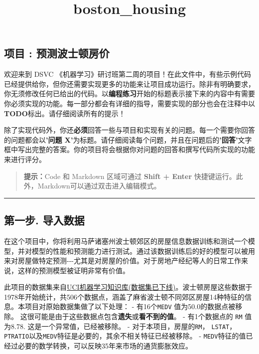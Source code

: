 \documentclass[11pt]{article}
\title{boston\_housing}
\begin{document}
    
    
    \maketitle
    
    

    
    \subsection{项目 :
预测波士顿房价}\label{ux9879ux76ee-ux9884ux6d4bux6ce2ux58ebux987fux623fux4ef7}

欢迎来到 DSVC
《机器学习》研讨班第二周的项目！在此文件中，有些示例代码已经提供给你，但你还需要实现更多的功能来让项目成功运行。除非有明确要求，你无须修改任何已给出的代码。以\textbf{编程练习}开始的标题表示接下来的内容中有需要你必须实现的功能。每一部分都会有详细的指导，需要实现的部分也会在注释中以\textbf{TODO}标出。请仔细阅读所有的提示！

除了实现代码外，你还\textbf{必须}回答一些与项目和实现有关的问题。每一个需要你回答的问题都会以\textbf{'问题
X'}为标题。请仔细阅读每个问题，并且在问题后的\textbf{'回答'}文字框中写出完整的答案。你的项目将会根据你对问题的回答和撰写代码所实现的功能来进行评分。

\begin{quote}
\textbf{提示：}Code 和 Markdown 区域可通过 \textbf{Shift + Enter}
快捷键运行。此外，Markdown可以通过双击进入编辑模式。
\end{quote}

    \begin{center}\rule{0.5\linewidth}{\linethickness}\end{center}

\subsection{第一步.
导入数据}\label{ux7b2cux4e00ux6b65.-ux5bfcux5165ux6570ux636e}

在这个项目中，你将利用马萨诸塞州波士顿郊区的房屋信息数据训练和测试一个模型，并对模型的性能和预测能力进行测试。通过该数据训练后的好的模型可以被用来对房屋做特定预测-\/-\/-尤其是对房屋的价值。对于房地产经纪等人的日常工作来说，这样的预测模型被证明非常有价值。

此项目的数据集来自\href{https://archive.ics.uci.edu/ml/datasets.html}{UCI机器学习知识库(数据集已下线)}。波士顿房屋这些数据于1978年开始统计，共506个数据点，涵盖了麻省波士顿不同郊区房屋14种特征的信息。本项目对原始数据集做了以下处理：
- 有16个\texttt{\textquotesingle{}MEDV\textquotesingle{}}
值为50.0的数据点被移除。
这很可能是由于这些数据点包含\textbf{遗失}或\textbf{看不到的值}。 -
有1个数据点的 \texttt{\textquotesingle{}RM\textquotesingle{}} 值为8.78.
这是一个异常值，已经被移除。 -
对于本项目，房屋的\texttt{\textquotesingle{}RM\textquotesingle{}}，
\texttt{\textquotesingle{}LSTAT\textquotesingle{}}，\texttt{\textquotesingle{}PTRATIO\textquotesingle{}}以及\texttt{\textquotesingle{}MEDV\textquotesingle{}}特征是必要的，其余不相关特征已经被移除。
-
\texttt{\textquotesingle{}MEDV\textquotesingle{}}特征的值已经过必要的数学转换，可以反映35年来市场的通货膨胀效应。
\end{document}
